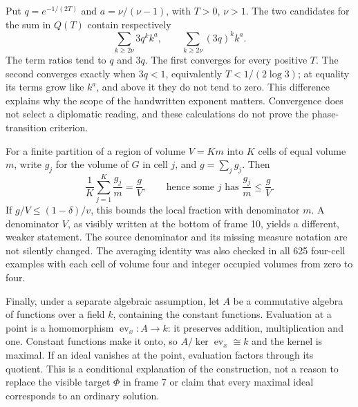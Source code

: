 \documentclass[11pt]{article}
\begin{document}
Put \(q=e^{-1/(2T)}\) and \(a=\nu/(\nu-1)\), with \(T>0\), \(\nu>1\). The two candidates for the sum in \(Q(T)\) contain respectively
\[\sum_{k\ge2\nu}3q^k k^a,\qquad
  \sum_{k\ge2\nu}(3q)^k k^a.\]
The term ratios tend to \(q\) and \(3q\). The first converges for every positive \(T\). The second converges exactly when \(3q<1\), equivalently \(T<1/(2\log3)\); at equality its terms grow like \(k^a\), and above it they do not tend to zero. This difference explains why the scope of the handwritten exponent matters. Convergence does not select a diplomatic reading, and these calculations do not prove the phase-transition criterion.

For a finite partition of a region of volume \(V=Km\) into \(K\) cells of equal volume \(m\), write \(g_j\) for the volume of \(G\) in cell \(j\), and \(g=\sum_jg_j\). Then
\[\frac1K\sum_{j=1}^K\frac{g_j}{m}=\frac gV,\qquad
 \text{hence some }j\text{ has }\frac{g_j}{m}\le\frac gV.\]
If \(g/V\le(1-\delta)/v\), this bounds the local fraction with denominator \(m\). A denominator \(V\), as visibly written at the bottom of frame 10, yields a different, weaker statement. The source denominator and its missing measure notation are not silently changed. The averaging identity was also checked in all 625 four-cell examples with each cell of volume four and integer occupied volumes from zero to four.

Finally, under a separate algebraic assumption, let \(A\) be a commutative algebra of functions over a field \(k\), containing the constant functions. Evaluation at a point is a homomorphism \(\operatorname{ev}_x:A\to k\): it preserves addition, multiplication and one. Constant functions make it onto, so \(A/\ker\operatorname{ev}_x\cong k\) and the kernel is maximal. If an ideal vanishes at the point, evaluation factors through its quotient. This is a conditional explanation of the construction, not a reason to replace the visible target \(\Phi\) in frame 7 or claim that every maximal ideal corresponds to an ordinary solution.
\end{document}
